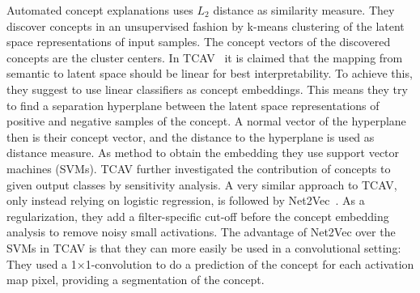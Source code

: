 Automated concept explanations \cite{ghorbani_towards_2019} uses
$L_2$ distance as similarity measure. They discover concepts in an
unsupervised fashion by k-means clustering of the latent space
representations of input samples. The concept vectors of the
discovered concepts are the cluster centers.
% 
In TCAV~\cite{kim_interpretability_2018} it is claimed that the
mapping from semantic to latent space should be linear for best
interpretability. To achieve this, they suggest to use linear
classifiers as concept embeddings. This means they try to find a
separation hyperplane between the latent space representations of
positive and negative samples of the concept.
A normal vector of the hyperplane then is their concept vector,
and the distance to the hyperplane
is used as distance measure.
As method to obtain the embedding they use support vector machines (SVMs).
TCAV further investigated the contribution of concepts to given output
classes by sensitivity analysis.
A very similar approach to TCAV, only instead relying on logistic
regression, is followed by Net2Vec~\cite{fong_net2vec_2018}.
As a regularization, they add a filter-specific cut-off before the
concept embedding analysis to remove noisy small activations.
The advantage of Net2Vec over the SVMs in TCAV is that they can
more easily be used in a convolutional setting: They used a
1$\times$1-convolution to do a prediction of the concept for each
activation map pixel, providing a segmentation of the concept.
